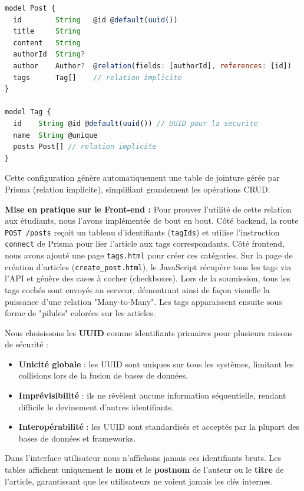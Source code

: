 \begin{lstlisting}[language=JavaScript]
model Post {
  id        String   @id @default(uuid())
  title     String
  content   String
  authorId  String?
  author    Author?  @relation(fields: [authorId], references: [id])
  tags      Tag[]    // relation implicite
}

model Tag {
  id    String @id @default(uuid()) // UUID pour la securite
  name  String @unique
  posts Post[] // relation implicite
}
\end{lstlisting}
Cette configuration génère automatiquement une table de jointure gérée par Prisma (relation implicite), simplifiant grandement les opérations CRUD.

\textbf{Mise en pratique sur le Front-end :} Pour prouver l'utilité de cette relation aux étudiants, nous l'avons implémentée de bout en bout.
Côté backend, la route \texttt{POST /posts} reçoit un tableau d'identifiants (\texttt{tagIds}) et utilise l'instruction \texttt{connect} de Prisma pour lier l'article aux tags correspondants.
Côté frontend, nous avons ajouté une page \texttt{tags.html} pour créer ces catégories. Sur la page de création d'articles (\texttt{create\_post.html}), le JavaScript récupère tous les tags via l'API et génère des cases à cocher (checkboxes). Lors de la soumission, tous les tags cochés sont envoyés au serveur, démontrant ainsi de façon visuelle la puissance d'une relation "Many-to-Many". Les tags apparaissent ensuite sous forme de "pilules" colorées sur les articles.

Nous choisissons les \textbf{UUID} comme identifiants primaires pour plusieurs raisons de sécurité :
\begin{itemize}
    \item \textbf{Unicité globale} : les UUID sont uniques sur tous les systèmes, limitant les collisions lors de la fusion de bases de données.
    \item \textbf{Imprévisibilité} : ils ne révèlent aucune information séquentielle, rendant difficile le devinement d’autres identifiants.
    \item \textbf{Interopérabilité} : les UUID sont standardisés et acceptés par la plupart des bases de données et frameworks.
\end{itemize}

Dans l’interface utilisateur nous n’affichons jamais ces identifiants bruts. Les tables affichent uniquement le \textbf{nom} et le \textbf{postnom} de l’auteur ou le \textbf{titre} de l’article, garantissant que les utilisateurs ne voient jamais les clés internes.

